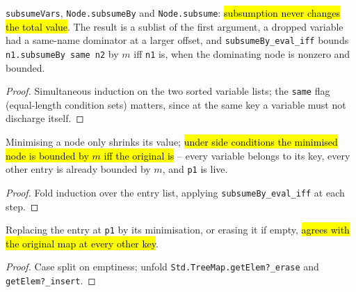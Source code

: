\begin{lemma}
\label{fam:lvl-subsume-node}
\leanok
{}

 \texttt{subsumeVars}, \texttt{Node.subsumeBy} and \texttt{Node.subsume}: \hl{subsumption
never changes the total value}. The result is a sublist of the first argument, a dropped variable had a
same-name dominator at a larger offset, and \texttt{subsumeBy\_eval\_iff} bounds \texttt{n1.subsumeBy
same n2} by $m$ iff \texttt{n1} is, when the dominating node is nonzero and bounded.
\end{lemma}
\begin{proof}
\leanok
{} Simultaneous induction on the two sorted variable lists; the \texttt{same} flag
(equal-length condition sets) matters, since at the same key a variable must not discharge itself.
\end{proof}

\begin{theorem}
\label{thm:lvl-minimize-eval}
\leanok
{}

 Minimising a node only shrinks its value; \hl{under side conditions the minimised node
is bounded by $m$ iff the original is} -- every variable belongs to its key, every other entry is
already bounded by $m$, and \texttt{p1} is live.
\end{theorem}
\begin{proof}
\leanok
{} Fold induction over the entry list, applying \texttt{subsumeBy\_eval\_iff} at each step.
\end{proof}

\begin{lemma}
\label{thm:lvl-subsumption-step}
\leanok
{}

 Replacing the entry at \texttt{p1} by its minimisation, or erasing it if empty, \hl{agrees
with the original map at every other key}.
\end{lemma}
\begin{proof}
\leanok
{} Case split on emptiness; unfold \texttt{Std.TreeMap.getElem?\_erase} and
\texttt{getElem?\_insert}.
\end{proof}

